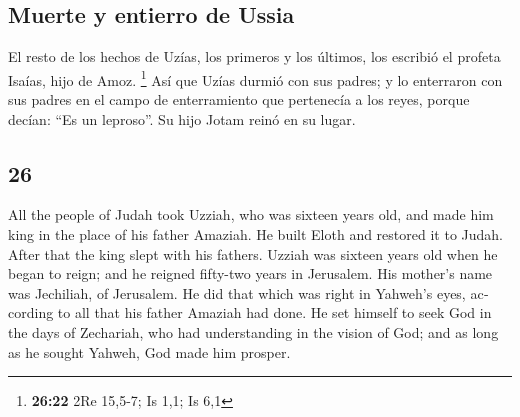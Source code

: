 \begin{paracol}{2}
\hypertarget{muerte-y-entierro-de-ussia}{%
\subsection{Muerte y entierro de
Ussia}\label{muerte-y-entierro-de-ussia}}

 El resto de los hechos de Uzías, los primeros y los
últimos, los escribió el profeta Isaías, hijo de Amoz. \footnote{\textbf{26:22}
  2Re 15,5-7; Is 1,1; Is 6,1}  Así que Uzías durmió con
sus padres; y lo enterraron con sus padres en el campo de enterramiento
que pertenecía a los reyes, porque decían: ``Es un leproso''. Su hijo
Jotam reinó en su lugar.

\switchcolumn
\begin{otherlanguage}{english}

\hypertarget{section-51}{%
\section{26}\label{section-51}}

 All the people of Judah took Uzziah, who was sixteen
years old, and made him king in the place of his father Amaziah.
 He built Eloth and restored it to Judah. After that the
king slept with his fathers.  Uzziah was sixteen years old
when he began to reign; and he reigned fifty-two years in Jerusalem. His
mother's name was Jechiliah, of Jerusalem.  He did that
which was right in Yahweh's eyes, according to all that his father
Amaziah had done.  He set himself to seek God in the days
of Zechariah, who had understanding in the vision of God; and as long as
he sought Yahweh, God made him prosper.


\end{otherlanguage}
\end{paracol}
